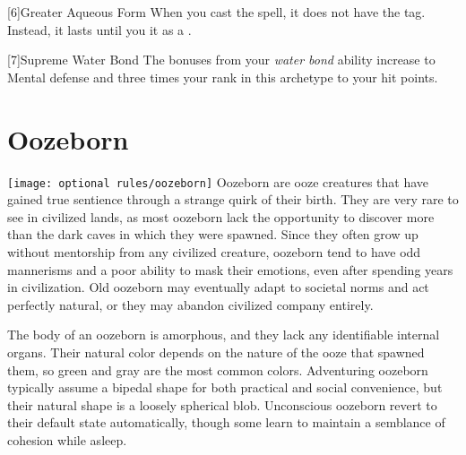         [6]{Greater Aqueous Form} When you cast the  spell, it does not have the  tag.
        Instead, it lasts until you  it as a .

        [7]{Supreme Water Bond} The bonuses from your \textit{water bond} ability increase to  Mental defense and three times your rank in this archetype to your hit points.

\section{Oozeborn}
    \texttt{[image: optional rules/oozeborn]}
    Oozeborn are ooze creatures that have gained true sentience through a strange quirk of their birth.
    They are very rare to see in civilized lands, as most oozeborn lack the opportunity to discover more than the dark caves in which they were spawned.
    Since they often grow up without mentorship from any civilized creature, oozeborn tend to have odd mannerisms and a poor ability to mask their emotions, even after spending years in civilization.
    Old oozeborn may eventually adapt to societal norms and act perfectly natural, or they may abandon civilized company entirely.

    The body of an oozeborn is amorphous, and they lack any identifiable internal organs.
    Their natural color depends on the nature of the ooze that spawned them, so green and gray are the most common colors.
    Adventuring oozeborn typically assume a bipedal shape for both practical and social convenience, but their natural shape is a loosely spherical blob.
    Unconscious oozeborn revert to their default state automatically, though some learn to maintain a semblance of cohesion while asleep.

